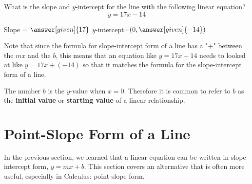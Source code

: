 \documentclass[nooutcomes]{ximera}
\begin{document}
\begin{problem}
What is the slope and $y$-intercept for the line with the following linear equation?
$$y=17x-14$$

Slope = $\answer[given]{17}$
$y$-intercept=$(0,\answer[given]{-14})$
\begin{hint}
Note that since the formula for slope-intercept form of a line has a "+" between the $mx$ and the $b$, this means that an equation like $y=17x-14$ needs to looked at like $y=17x+(-14)$ so that it matches the formula for the slope-intercept form of a line.
\end{hint}

\end{problem}


\begin{remark}
The number $b$ is the $y$-value when $x=0$. Therefore it is common to refer to $b$ as the \textbf{initial value} or \textbf{starting value} of a linear relationship.
\end{remark}




\section{Point-Slope Form of a Line}

In the previous section, we learned that a linear equation can be written in slope-intercept form, $y=mx+b$. This section covers an alternative that is often more useful, especially in Calculus: point-slope form.
\end{document}
